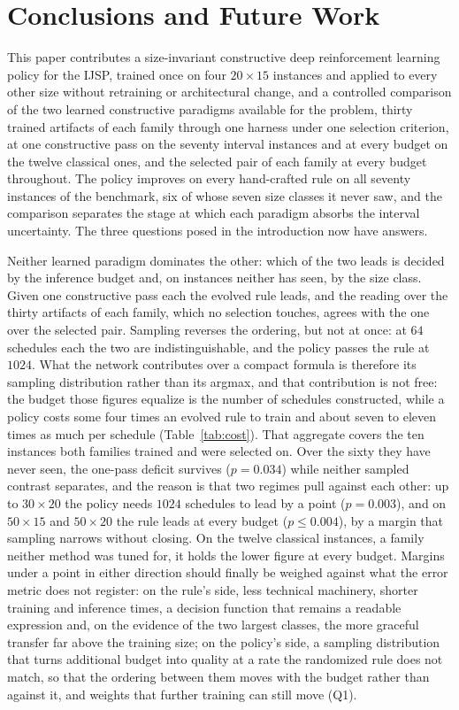 \documentclass[preprint,authoryear,12pt]{elsarticle}
\theoremstyle{definition}
\theoremstyle{remark}
\begin{document}
\FloatBarrier
\section{Conclusions and Future Work}
\label{sec:conclusions}

This paper contributes a size-invariant constructive deep
reinforcement learning policy for the IJSP, trained once on four
$20{\times}15$ instances and applied to every other size without
retraining or architectural change, and a controlled comparison of
the two learned constructive paradigms available for the problem,
thirty trained artifacts of each family through one harness under one
selection criterion, at one constructive pass on the seventy interval
instances and at every budget on the twelve classical ones, and the
selected pair of each family at every budget throughout. The
policy improves on every hand-crafted rule on all seventy instances
of the benchmark, six of whose seven size classes it never saw, and
the comparison separates the stage at which each paradigm absorbs the
interval uncertainty. The three questions posed in the introduction
now have answers.

Neither learned paradigm dominates the other: which of the two leads
is decided by the inference budget and, on instances neither has
seen, by the size class.
Given one constructive pass each the evolved rule leads, and the
reading over the thirty artifacts of each family, which no selection
touches, agrees with the one over the selected pair. Sampling
reverses the ordering, but not at once: at $64$ schedules each the
two are indistinguishable, and the policy passes the rule at $1024$.
What the network contributes over a compact formula is
therefore its sampling distribution rather than its argmax, and that
contribution is not free: the budget those figures equalize is the
number of schedules constructed, while a policy costs some four times
an evolved rule to train and about seven to eleven times as much per
schedule (Table~\ref{tab:cost}).
That aggregate covers the ten instances both families trained and
were selected on. Over the sixty they have never seen, the one-pass
deficit survives ($p=0.034$) while neither sampled contrast
separates, and the reason is that two regimes pull against each
other: up to $30{\times}20$ the policy needs $1024$ schedules to lead
by a point ($p=0.003$), and on $50{\times}15$ and $50{\times}20$ the
rule leads at every budget ($p\le0.004$), by a margin that sampling
narrows without closing. On the twelve
classical instances, a family neither method was tuned for, it holds
the lower figure at every budget. Margins under a point in either
direction should finally be weighed against what the error metric
does not register: on the rule's side, less technical machinery,
shorter training and inference times, a decision function that
remains a readable expression and, on the evidence of the two largest
classes, the more graceful transfer far above the training size; on
the policy's side, a sampling distribution that turns additional
budget into quality at a rate the randomized rule does not match, so
that the ordering between them moves with the budget rather than
against it, and weights that further training can still move (Q1).
\end{document}
